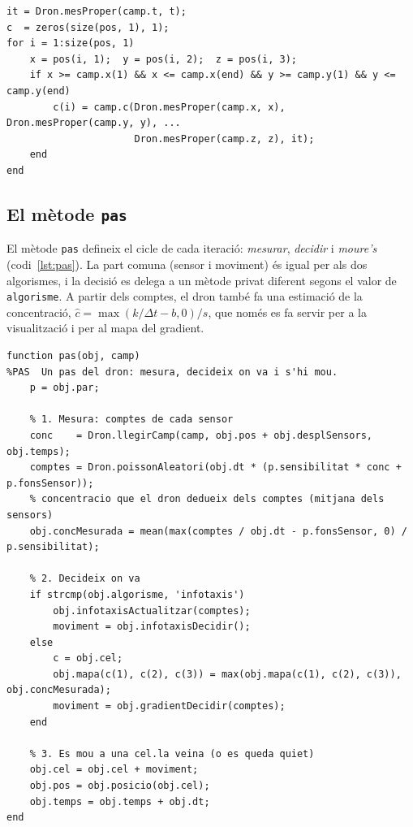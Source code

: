 \documentclass[11pt,a4paper]{article}
\begin{document}
\begin{lstlisting}[caption={Lectura del camp pels sensors (part de \texttt{Dron.llegirCamp}).}, label=lst:llegircamp]
it = Dron.mesProper(camp.t, t);
c  = zeros(size(pos, 1), 1);
for i = 1:size(pos, 1)
    x = pos(i, 1);  y = pos(i, 2);  z = pos(i, 3);
    if x >= camp.x(1) && x <= camp.x(end) && y >= camp.y(1) && y <= camp.y(end)
        c(i) = camp.c(Dron.mesProper(camp.x, x), Dron.mesProper(camp.y, y), ...
                      Dron.mesProper(camp.z, z), it);
    end
end
\end{lstlisting}

\subsection{El mètode \texttt{pas}}

El mètode \texttt{pas} defineix el cicle de cada iteració: \emph{mesurar}, \emph{decidir} i \emph{moure's} (codi~\ref{lst:pas}). La part comuna (sensor i moviment) és igual per als dos algorismes, i la decisió es delega a un mètode privat diferent segons el valor de \texttt{algorisme}. A partir dels comptes, el dron també fa una estimació de la concentració, $\hat c = \max(k/\Delta t - b, 0)/s$, que només es fa servir per a la visualització i per al mapa del gradient.

\begin{lstlisting}[caption={Un pas del dron (\texttt{Dron.pas}).}, label=lst:pas]
function pas(obj, camp)
%PAS  Un pas del dron: mesura, decideix on va i s'hi mou.
    p = obj.par;

    % 1. Mesura: comptes de cada sensor
    conc    = Dron.llegirCamp(camp, obj.pos + obj.desplSensors, obj.temps);
    comptes = Dron.poissonAleatori(obj.dt * (p.sensibilitat * conc + p.fonsSensor));
    % concentracio que el dron dedueix dels comptes (mitjana dels sensors)
    obj.concMesurada = mean(max(comptes / obj.dt - p.fonsSensor, 0) / p.sensibilitat);

    % 2. Decideix on va
    if strcmp(obj.algorisme, 'infotaxis')
        obj.infotaxisActualitzar(comptes);
        moviment = obj.infotaxisDecidir();
    else
        c = obj.cel;
        obj.mapa(c(1), c(2), c(3)) = max(obj.mapa(c(1), c(2), c(3)), obj.concMesurada);
        moviment = obj.gradientDecidir(comptes);
    end

    % 3. Es mou a una cel.la veina (o es queda quiet)
    obj.cel = obj.cel + moviment;
    obj.pos = obj.posicio(obj.cel);
    obj.temps = obj.temps + obj.dt;
end
\end{lstlisting}
\end{document}
